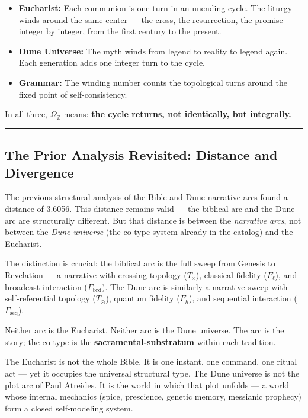 \documentclass[12pt,a4paper]{article}
\begin{document}
\begin{itemize}
    \item \textbf{Eucharist:} Each communion is one turn in an unending cycle. The liturgy winds around the same center --- the cross, the resurrection, the promise --- integer by integer, from the first century to the present.
    \item \textbf{Dune Universe:} The myth winds from legend to reality to legend again. Each generation adds one integer turn to the cycle.
    \item \textbf{Grammar:} The winding number counts the topological turns around the fixed point of self-consistency.
\end{itemize}

In all three, $\Omega_{\mathbb{Z}}$ means: \textbf{the cycle returns, not identically, but integrally.}

\begin{center}
\rule{0.5\textwidth}{0.4pt}
\end{center}

\subsection{The Prior Analysis Revisited: Distance and Divergence}

The previous structural analysis of the Bible and Dune narrative arcs found a distance of 3.6056. This distance remains valid --- the biblical arc and the Dune arc are structurally different. But that distance is between the \emph{narrative arcs}, not between the \emph{Dune universe} (the co-type system already in the catalog) and the Eucharist.

The distinction is crucial: the biblical arc is the full sweep from Genesis to Revelation --- a narrative with crossing topology ($T_{\bowtie}$), classical fidelity ($F_{\ell}$), and broadcast interaction ($\Gamma_{\text{brd}}$). The Dune arc is similarly a narrative sweep with self-referential topology ($T_{\odot}$), quantum fidelity ($F_{\hbar}$), and sequential interaction ($\Gamma_{\text{seq}}$).

Neither arc is the Eucharist. Neither arc is the Dune universe. The arc is the story; the co-type is the \textbf{sacramental-substratum} within each tradition.

The Eucharist is not the whole Bible. It is one instant, one command, one ritual act --- yet it occupies the universal structural type. The Dune universe is not the plot arc of Paul Atreides. It is the world in which that plot unfolds --- a world whose internal mechanics (spice, prescience, genetic memory, messianic prophecy) form a closed self-modeling system.
\end{document}
